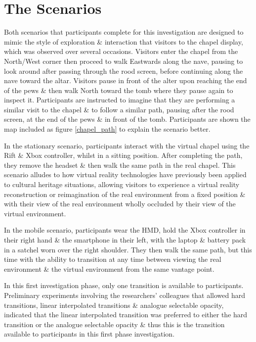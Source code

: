 \section{The Scenarios}
Both scenarios that participants complete for this investigation are designed to mimic the style of exploration \& interaction that visitors to the chapel display, which was observed over several occasions. Visitors enter the chapel from the North/West corner then proceed to walk Eastwards along the nave, pausing to look around after passing through the rood screen, before continuing along the nave toward the altar. Visitors pause in front of the alter upon reaching the end of the pews \& then walk North toward the tomb where they pause again to inspect it. Participants are instructed to imagine that they are performing a similar visit to the chapel \& to follow a similar path, pausing after the rood screen, at the end of the pews \& in front of the tomb. Participants are shown the map included as figure \ref{chapel_path} to explain the scenario better.

In the stationary scenario, participants interact with the virtual chapel using the Rift \& Xbox controller, whilst in a sitting position. After completing the path, they remove the headset \& then walk the same path in the real chapel. This scenario alludes to how virtual reality technologies have previously been applied to cultural heritage situations, allowing visitors to experience a virtual reality reconstruction or reimagination of the real environment from a fixed position \& with their view of the real environment wholly occluded by their view of the virtual environment.

In the mobile scenario, participants wear the HMD, hold the Xbox controller in their right hand \& the smartphone in their left, with the laptop \& battery pack in a satchel worn over the right shoulder. They then walk the same path, but this time with the ability to transition at any time between viewing the real environment \& the virtual environment from the same vantage point.

In this first investigation phase, only one transition is available to participants. Preliminary experiments involving the researchers' colleagues that allowed hard transitions, linear interpolated transitions \& analogue selectable opacity, indicated that the linear interpolated transition was preferred to either the hard transition or the analogue selectable opacity \& thus this is the transition available to participants in this first phase investigation.

